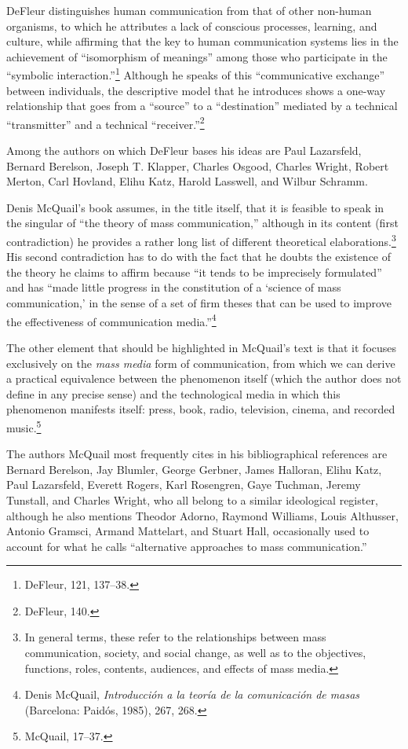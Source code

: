 \documentclass{tufte-handout}
\begin{document}
DeFleur distinguishes human communication from that of other non-human
organisms, to which he attributes a lack of conscious processes,
learning, and culture, while affirming that the key to human
communication systems lies in the achievement of ``isomorphism of
meanings'' among those who participate in the ``symbolic
interaction.''\footnote{DeFleur, 121, 137--38.} Although he speaks of
this ``communicative exchange'' between individuals, the descriptive
model that he introduces shows a one-way relationship that goes from a
``source'' to a ``destination'' mediated by a technical ``transmitter''
and a technical ``receiver.''\footnote{DeFleur, 140.}

Among the authors on which DeFleur bases his ideas are Paul Lazarsfeld,
Bernard Berelson, Joseph T. Klapper, Charles Osgood, Charles Wright,
Robert Merton, Carl Hovland, Elihu Katz, Harold Lasswell, and Wilbur
Schramm.

Denis McQuail's book assumes, in the title itself, that it is feasible
to speak in the singular of ``the theory of mass communication,''
although in its content (first contradiction) he provides a rather long
list of different theoretical elaborations.\footnote{In general terms,
  these refer to the relationships between mass communication, society,
  and social change, as well as to the objectives, functions, roles,
  contents, audiences, and effects of mass media.} His second
contradiction has to do with the fact that he doubts the existence of
the theory he claims to affirm because ``it tends to be imprecisely
formulated'' and has ``made little progress in the constitution of a
`science of mass communication,' in the sense of a set of firm theses
that can be used to improve the effectiveness of communication
media.''\footnote{Denis McQuail, \emph{Introducción a la teoría de la
  comunicación de masas} (Barcelona: Paidós, 1985), 267, 268.}

The other element that should be highlighted in McQuail's text is that
it focuses exclusively on the \emph{mass media} form of communication,
from which we can derive a practical equivalence between the phenomenon
itself (which the author does not define in any precise sense) and the
technological media in which this phenomenon manifests itself: press,
book, radio, television, cinema, and recorded music.\footnote{McQuail,
  17--37.}

The authors McQuail most frequently cites in his bibliographical
references are Bernard Berelson, Jay Blumler, George Gerbner, James
Halloran, Elihu Katz, Paul Lazarsfeld, Everett Rogers, Karl Rosengren,
Gaye Tuchman, Jeremy Tunstall, and Charles Wright, who all belong to a
similar ideological register, although he also mentions Theodor Adorno,
Raymond Williams, Louis Althusser, Antonio Gramsci, Armand Mattelart,
and Stuart Hall, occasionally used to account for what he calls
``alternative approaches to mass communication.''
\end{document}
